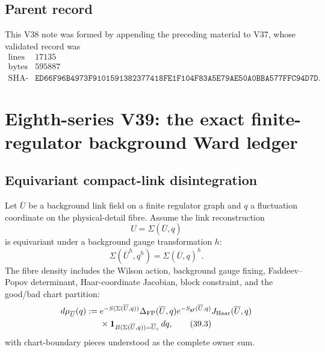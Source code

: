 \documentclass[11pt,oneside]{book}
\theoremstyle{definition}
\theoremstyle{remark}
\begin{document}
\subsection{Parent record}

This V38 note was formed by appending the preceding material to V37,
whose validated record was
\[
\begin{array}{c|c}
\text{lines}&17135\\
\text{bytes}&595887\\
\text{SHA-256}&
\texttt{ED66F96B4973F9101591382377418FE1F104F83A5E79AE50A0BBA577FFC94D7D}.
\end{array}
\]



\section{Eighth-series V39: the exact finite-regulator background
Ward ledger}

\subsection{Equivariant compact-link disintegration}

Let \(\overline U\) be a background link field on a finite regulator
graph and \(q\) a fluctuation coordinate on the physical-detail
fibre.  Assume the link reconstruction
\[
                         U=\Sigma(\overline U,q)                 \tag{39.1}
\]
is equivariant under a background gauge transformation \(h\):
\[
 \Sigma(\overline U^h,q^h)=\Sigma(\overline U,q)^h.              \tag{39.2}
\]
The fibre density includes the Wilson action, background gauge
fixing, Faddeev--Popov determinant, Haar-coordinate Jacobian, block
constraint, and the good/bad chart partition:
\[
\begin{split}
 d\mu_{\overline U}(q):={}&
 e^{-S(\Sigma(\overline U,q))}
 \Delta_{\rm FP}(\overline U,q)
 e^{-S_{\rm gf}(\overline U,q)}
 J_{\rm Haar}(\overline U,q)\\
 &\times{\bf1}_{B(\Sigma(\overline U,q))=\overline U_{\rm c}}\,
 d q,
                                                                  \tag{39.3}
\end{split}
\]
with chart-boundary pieces understood as the complete owner sum.
\end{document}
